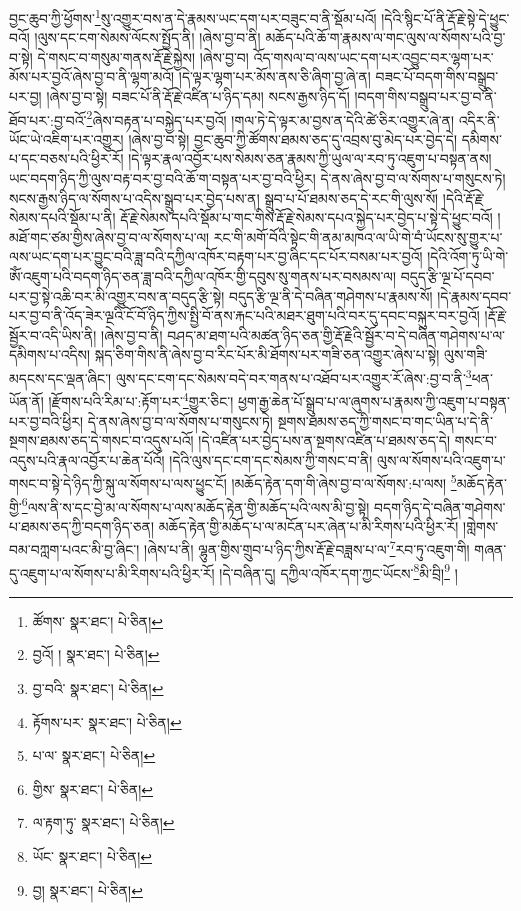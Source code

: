 བྱང་ཆུབ་ཀྱི་ཕྱོགས་\footnote{ཚོགས་  སྣར་ཐང་།  པེ་ཅིན། }སུ་འགྱུར་བས་ན་དེ་རྣམས་ཡང་དག་པར་བཟུང་བ་ནི་སྡོམ་པའོ། །དེའི་སྙིང་པོ་ནི་རྡོ་རྗེ་སྟེ་དེ་ཕྱུང་བའོ། །ལུས་དང་ངག་སེམས་ལོངས་སྤྱོད་ནི། །ཞེས་བྱ་བ་ནི། མཆོད་པའི་ཆོ་ག་རྣམས་ལ་གང་ལུས་ལ་སོགས་པའི་བྱ་བ་སྟེ། དེ་གསང་བ་གསུམ་གནས་རྡོ་རྗེ་སྐྱེས། །ཞེས་བྱ་བ། འོད་གསལ་བ་ལས་ཡང་དག་པར་འབྱུང་བར་ལྷག་པར་མོས་པར་བྱའོ་ཞེས་བྱ་བ་ནི་ལྷག་མའོ། །དེ་ལྟར་ལྷག་པར་མོས་ནས་ཅི་ཞིག་བྱ་ཞེ་ན། བཟང་པོ་བདག་གིས་བསྒྲུབ་པར་བྱ། །ཞེས་བྱ་བ་སྟེ། བཟང་པོ་ནི་རྡོ་རྗེ་འཛིན་པ་ཉིད་དམ། སངས་རྒྱས་ཉིད་དོ། །བདག་གིས་བསྒྲུབ་པར་བྱ་བ་ནི་ཐོབ་པར་:བྱ་བའོ་\footnote{བྱའོ། །  སྣར་ཐང་།  པེ་ཅིན། }ཞེས་བརྟན་པ་བསྐྱེད་པར་བྱའོ། །གལ་ཏེ་དེ་ལྟར་མ་བྱས་ན་དེའི་ཚེ་ཅིར་འགྱུར་ཞེ་ན། འདིར་ནི་ཡོང་ཡེ་འཇིག་པར་འགྱུར། །ཞེས་བྱ་བ་སྟེ། བྱང་ཆུབ་ཀྱི་ཚོགས་ཐམས་ཅད་དུ་འབྲས་བུ་མེད་པར་བྱེད་དེ། དམིགས་པ་དང་བཅས་པའི་ཕྱིར་རོ། །དེ་ལྟར་རྣལ་འབྱོར་པས་སེམས་ཅན་རྣམས་ཀྱི་ཡུལ་ལ་རབ་ཏུ་འཇུག་པ་བསྟན་ནས། ཡང་བདག་ཉིད་ཀྱི་ལུས་བརྟ་བར་བྱ་བའི་ཆོ་ག་བསྟན་པར་བྱ་བའི་ཕྱིར། དེ་ནས་ཞེས་བྱ་བ་ལ་སོགས་པ་གསུངས་ཏེ། སངས་རྒྱས་ཉིད་ལ་སོགས་པ་འདིས་སྒྲུབ་པར་བྱེད་པས་ན། སྒྲུབ་པ་པོ་ཐམས་ཅད་དེ་རང་གི་ལུས་སོ། །དེའི་རྡོ་རྗེ་སེམས་དཔའི་སྡོམ་པ་ནི། རྡོ་རྗེ་སེམས་དཔའི་སྡོམ་པ་གང་གིས་རྡོ་རྗེ་སེམས་དཔའ་སྐྱེད་པར་བྱེད་པ་སྟེ་དེ་ཕྱུང་བའོ། །མཐོ་གང་ཙམ་གྱིས་ཞེས་བྱ་བ་ལ་སོགས་པ་ལ། རང་གི་མགོ་བོའི་སྟེང་གི་ནམ་མཁའ་ལ་ཡི་གེ་བཾ་ཡོངས་སུ་གྱུར་པ་ལས་ཡང་དག་པར་བྱུང་བའི་ཟླ་བའི་དཀྱིལ་འཁོར་བརྟག་པར་བྱ་ཞིང་དང་པོར་བསམ་པར་བྱའོ། །དེའི་འོག་ཏུ་ཡི་གེ་ཨོཾ་འཇུག་པའི་བདག་ཉིད་ཅན་ཟླ་བའི་དཀྱིལ་འཁོར་གྱི་དབུས་སུ་གནས་པར་བསམས་ལ། བདུད་རྩི་ལྔ་པོ་དབབ་པར་བྱ་སྟེ་འཆི་བར་མི་འགྱུར་བས་ན་བདུད་རྩི་སྟེ། བདུད་རྩི་ལྔ་ནི་དེ་བཞིན་གཤེགས་པ་རྣམས་སོ། །དེ་རྣམས་དབབ་པར་བྱ་བ་ནི་འོད་ཟེར་ལྔའི་ངོ་བོ་ཉིད་ཀྱིས་སྤྱི་བོ་ནས་རྐང་པའི་མཐར་ཐུག་པའི་བར་དུ་དབང་བསྐུར་བར་བྱའོ། །རྡོ་རྗེ་སྦྱོར་བ་འདི་ཡིས་ནི། །ཞེས་བྱ་བ་ནི། བཤད་མ་ཐག་པའི་མཚན་ཉིད་ཅན་གྱི་རྡོ་རྗེའི་སྦྱོར་བ་དེ་བཞིན་གཤེགས་པ་ལ་དམིགས་པ་འདིས། སྐད་ཅིག་གིས་ནི་ཞེས་བྱ་བ་རིང་པོར་མི་ཐོགས་པར་གཟི་ཅན་འགྱུར་ཞེས་པ་སྟེ། ལུས་གཟི་མདངས་དང་ལྡན་ཞིང་། ལུས་དང་ངག་དང་སེམས་བདེ་བར་གནས་པ་འཐོབ་པར་འགྱུར་རོ་ཞེས་:བྱ་བ་ནི་\footnote{བྱ་བའི་  སྣར་ཐང་།  པེ་ཅིན། }ཕན་ཡོན་ནོ། །རྫོགས་པའི་རིམ་པ་:རྟོག་པར་\footnote{རྟོགས་པར་  སྣར་ཐང་།  པེ་ཅིན། }གྱུར་ཅིང་། ཕྱག་རྒྱ་ཆེན་པོ་སྒྲུབ་པ་ལ་ཞུགས་པ་རྣམས་ཀྱི་འཇུག་པ་བསྟན་པར་བྱ་བའི་ཕྱིར། དེ་ནས་ཞེས་བྱ་བ་ལ་སོགས་པ་གསུངས་ཏེ། སྔགས་ཐམས་ཅད་ཀྱི་གསང་བ་གང་ཡིན་པ་དེ་ནི་སྔགས་ཐམས་ཅད་དེ་གསང་བ་འདུས་པའོ། །དེ་འཛིན་པར་བྱེད་པས་ན་སྔགས་འཛིན་པ་ཐམས་ཅད་དེ། གསང་བ་འདུས་པའི་རྣལ་འབྱོར་པ་ཆེན་པོའོ། །དེའི་ལུས་དང་ངག་དང་སེམས་ཀྱི་གསང་བ་ནི། ལུས་ལ་སོགས་པའི་འཇུག་པ་གསང་བ་སྟེ་དེ་ཉིད་ཀྱི་སྐུ་ལ་སོགས་པ་ལས་ཕྱུང་ངོ། །མཆོད་རྟེན་དག་གི་ཞེས་བྱ་བ་ལ་སོགས་:པ་ལས། \footnote{པ་ལ་  སྣར་ཐང་།  པེ་ཅིན། }མཆོད་རྟེན་གྱི་\footnote{གྱིས་  སྣར་ཐང་།  པེ་ཅིན། }ལས་ནི་ས་དང་བྱེ་མ་ལ་སོགས་པ་ལས་མཆོད་རྟེན་གྱི་མཆོད་པའི་ལས་མི་བྱ་སྟེ། བདག་ཉིད་དེ་བཞིན་གཤེགས་པ་ཐམས་ཅད་ཀྱི་བདག་ཉིད་ཅན། མཆོད་རྟེན་གྱི་མཆོད་པ་ལ་མངོན་པར་ཞེན་པ་མི་རིགས་པའི་ཕྱིར་རོ། །གླེགས་བམ་བཀླག་པའང་མི་བྱ་ཞིང་། །ཞེས་པ་ནི། ལྷུན་གྱིས་གྲུབ་པ་ཉིད་ཀྱིས་རྡོ་རྗེ་བཟླས་པ་ལ་\footnote{ལ་རྟག་ཏུ་  སྣར་ཐང་།  པེ་ཅིན། }རབ་ཏུ་འཇུག་གི། གཞན་དུ་འཇུག་པ་ལ་སོགས་པ་མི་རིགས་པའི་ཕྱིར་རོ། །དེ་བཞིན་དུ། དཀྱིལ་འཁོར་དག་ཀྱང་ཡོངས་\footnote{ཡོང་  སྣར་ཐང་།  པེ་ཅིན། }མི་བྲི།\footnote{བྱ།  སྣར་ཐང་།  པེ་ཅིན། } །
